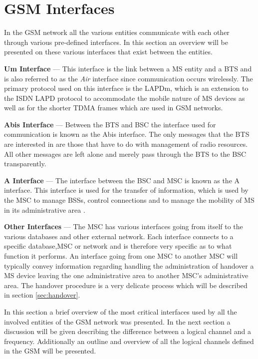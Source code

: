 \section{GSM Interfaces}
\label{sec:gsminterfaces}
In the GSM network all the various entities communicate with each other through various pre-defined interfaces. In this section an overview will be presented on these various interfaces that exist between the entities.
\begin{description}
\item{\textbf{Um Interface}} --- This interface is the link between a MS entity and a BTS and is also referred to as the \emph{Air} interface since communication occurs wirelessly. The primary protocol used on this interface is the LAPDm, which is an extension to the ISDN LAPD protocol to accommodate the mobile nature of MS devices as well as for the shorter TDMA frames which are used in GSM networks\cite{wirelesstelcoMullet,GSMSecurInTeleNetwork}.
\item{\textbf{Abis Interface}} --- Between the BTS and BSC the interface used for communication is known as the Abis interface. The only messages that the BTS are interested in are those that have to do with management of radio resources\cite{wirelesstelcoMullet,GSMSecurInTeleNetwork}. All other messages are left alone and merely pass through the BTS to the BSC transparently.
\item{\textbf{A Interface}} --- The interface between the BSC and MSC is known as the A interface. This interface is used for the transfer of information, which is used by the MSC to manage BSSs, control connections and to manage the mobility of MS in its administrative area \cite{wirelesstelcoMullet,GSMArchitectureProtocolsServices}.
\item{\textbf{Other Interfaces}} --- The MSC has various interfaces going from itself to the various databases and other external network. Each interface connects to a specific database,MSC or network and is therefore very specific as to what function it performs\cite{wirelesstelcoMullet,GSMArchitectureProtocolsServices}. An interface going from one MSC to another MSC will typically convey information regarding handling the administration of handover a MS device leaving the one administrative area to another MSC's administrative area. The handover procedure is a very delicate process which will be described in section \ref{sec:handover}.
\end{description}

In this section a brief overview of the most critical interfaces used by all the involved entities of the GSM network was presented. In the next section a discussion will be given describing the difference between a logical channel and a frequency. Additionally an outline and overview of all the logical channels defined in the GSM will be presented. 
